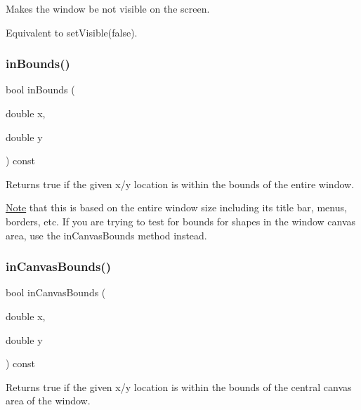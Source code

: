 Makes the window be not visible on the screen. 

Equivalent to set\+Visible(false). \mbox{\label{classGWindow_afc480f652b8c5f1fb255e2269ce68879}} 
\subsubsection{\texorpdfstring{in\+Bounds()}{inBounds()}}
{\footnotesize\ttfamily bool in\+Bounds (\begin{DoxyParamCaption}\item[{double}]{x,  }\item[{double}]{y }\end{DoxyParamCaption}) const\hspace{0.3cm}{\ttfamily [virtual]}}



Returns true if the given x/y location is within the bounds of the entire window. 

\mbox{\hyperlink{classNote}{Note}} that this is based on the entire window size including its title bar, menus, borders, etc. If you are trying to test for bounds for shapes in the window canvas area, use the in\+Canvas\+Bounds method instead. \mbox{\label{classGWindow_ae94c9ea850cba190c985dae9fc120d32}} 
\subsubsection{\texorpdfstring{in\+Canvas\+Bounds()}{inCanvasBounds()}}
{\footnotesize\ttfamily bool in\+Canvas\+Bounds (\begin{DoxyParamCaption}\item[{double}]{x,  }\item[{double}]{y }\end{DoxyParamCaption}) const\hspace{0.3cm}{\ttfamily [virtual]}}



Returns true if the given x/y location is within the bounds of the central canvas area of the window. 

\mbox{\label{classGDrawingSurface_a814498efebc5586645159cd22990cf61}} 
